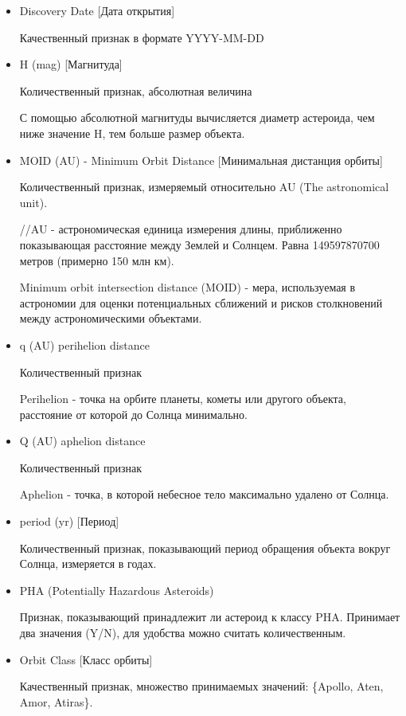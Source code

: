 \documentclass{article}
\begin{document}
\begin{itemize}
\item {Discovery Date [Дата открытия]} 

Качественный признак в формате YYYY-MM-DD

\item {H (mag) [Магнитуда]}

Количественный признак, абсолютная величина

С помощью абсолютной магнитуды вычисляется диаметр астероида, чем ниже значение H, тем больше размер объекта.

\item {MOID (AU) - Minimum Orbit Distance [Минимальная дистанция орбиты]}

Количественный признак, измеряемый относительно AU (The astronomical unit).

//AU - астрономическая единица измерения длины, приближенно показывающая расстояние между Землей и Солнцем. Равна 149597870700 метров (примерно 150 млн км).

Minimum orbit intersection distance (MOID) - мера, используемая в астрономии для оценки потенциальных сближений и рисков столкновений между астрономическими объектами.

\item {q (AU) perihelion distance}

Количественный признак

Perihelion - точка на орбите планеты, кометы или другого объекта, расстояние от которой до Солнца минимально.

\item {Q (AU) aphelion distance}

Количественный признак

Aphelion - точка, в которой небесное тело максимально удалено от Солнца.

\item {period (yr) [Период]}

Количественный признак, показывающий период обращения объекта вокруг Солнца, измеряется в годах.


\item {PHA (Potentially Hazardous Asteroids)}

Признак, показывающий принадлежит ли астероид к классу PHA. 
Принимает два значения (Y/N), для удобства можно считать количественным. 

\item {Orbit Class [Класс орбиты]}

Качественный признак, множество принимаемых значений: \{Apollo, Aten, Amor, Atiras\}.\\[0.3cm]

\end{itemize} 
\end{document}
